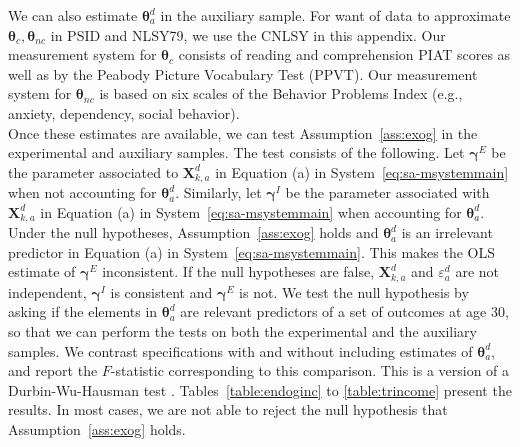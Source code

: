 \noindent We can also estimate $\bm{\theta}_{a}^d$ in the auxiliary sample. For want of data to approximate $\bm{\theta}_{c}, \bm{\theta}_{nc}$ in PSID and NLSY79, we use the CNLSY in this appendix. Our measurement system for $\bm{\theta}_{c}$ consists of reading and comprehension PIAT scores as well as by the Peabody Picture Vocabulary Test (PPVT). Our measurement system for $\bm{\theta}_{nc}$ is based on six scales of the Behavior Problems Index (e.g., anxiety, dependency, social behavior).\\

\noindent Once these estimates are available, we can test Assumption~\ref{ass:exog} in the experimental and auxiliary samples. The test consists of the following. Let $\bm{\gamma}^E$ be the parameter associated to $\bm{X}^d_{k,a}$ in Equation (a) in System~\eqref{eq:sa-msystemmain} when not accounting for $\bm{\theta}_{a}^d$. Similarly, let $\bm{\gamma}^I$ be the parameter associated with $\bm{X}^d_{k,a}$ in Equation (a) in System~\eqref{eq:sa-msystemmain} when accounting for $\bm{\theta}_{a}^d$. Under the null hypotheses, Assumption~\ref{ass:exog} holds and $\bm{\theta}_{a}^d$ is an irrelevant predictor in Equation (a) in System~\eqref{eq:sa-msystemmain}. This makes the OLS estimate of $\bm{\gamma}^E$ inconsistent. If the null hypotheses are false, $\bm{X}^d_{k,a}$ and $\varepsilon_{a}^d$ are not independent, $\bm{\gamma}^I$ is consistent and $\bm{\gamma}^E$ is not. We test the null hypothesis by asking if the elements in $\bm{\theta}_{a}^d$ are relevant predictors of a set of outcomes at age 30, so that we can perform the tests on both the experimental and the auxiliary samples. We contrast specifications with and without including estimates of $\bm{\theta}_{a}^d$, and report the $F$-statistic corresponding to this comparison. This is a version of a Durbin-Wu-Hausman test \citep[see][]{Durbin_1954_RISI,Wu_1973_Econometrica,Hausman_1978_Econometrica}. Tables~\ref{table:endoginc} to \ref{table:trincome} present the results. In most cases, we are not able to reject the null hypothesis that Assumption~\ref{ass:exog} holds.\\


